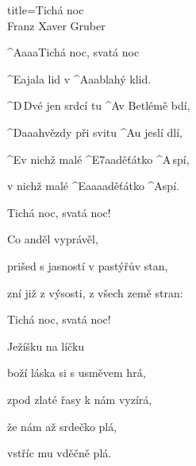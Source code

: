 \begin{song}{title=\predtitle\centering Tichá noc \\\large Franz Xaver Gruber \vspace*{-0.3cm}}  %
\begin{centerjustified}
\nejnejvetsi

\sloka
	^{A{\color{white}aaa}}Tichá noc, svatá noc

	^{E{\color{white}a}}jala lid v ^{A{\color{white}aa}}blahý klid.

	^{D\,}Dvé jen srdcí tu ^{A}v Betlémě bdí,

	^{D{\color{white}aaa}}hvězdy při svitu ^{A}u jeslí dlí,

	^{E}v nichž malé ^{E7{\color{white}aa}}děťátko ^{A\,}spí,

	v nichž malé ^{E{\color{white}aaaa}}děťátko ^{A}spí.

\sloka
	Tichá noc, svatá noc!

	Co anděl vyprávěl,

	prišed s jasností v pastýřův stan,

	zní již z výsosti, z všech země stran:



\sloka
	Tichá noc, svatá noc!

	Ježíšku na líčku

	boží láska si s usměvem hrá,

	zpod zlaté řasy k nám vyzírá,

	že nám až srdečko plá,

	vstříc mu vděčně plá.

\end{centerjustified}
\setcounter{Slokočet}{0}
\end{song}


